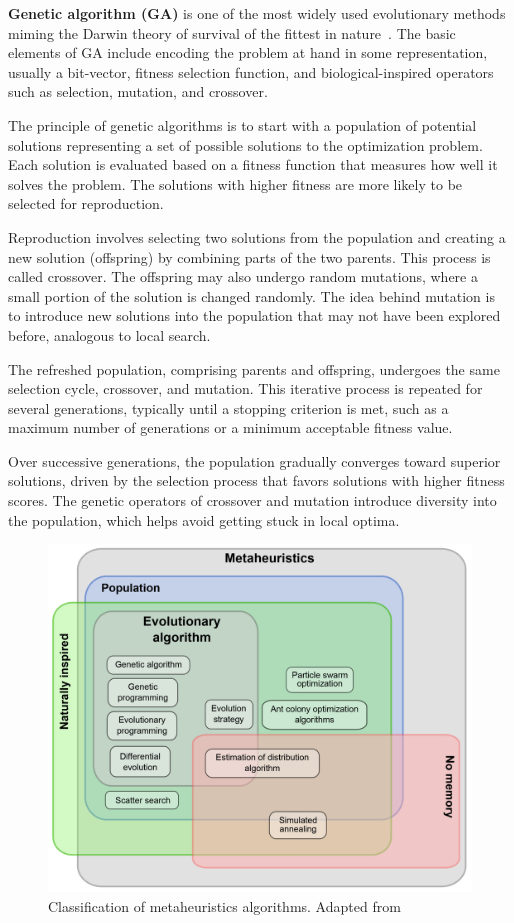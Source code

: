 \textbf{Genetic algorithm (GA)} is one of the most widely used evolutionary methods miming the Darwin theory of survival of the fittest in nature~\cite{darwin1859}. The basic elements of GA include encoding the problem at hand in some representation, usually a bit-vector, fitness selection function, and biological-inspired operators such as selection, mutation, and crossover.

The principle of genetic algorithms is to start with a population of potential solutions representing a set of possible solutions to the optimization problem. Each solution is evaluated based on a fitness function that measures how well it solves the problem. The solutions with higher fitness are more likely to be selected for reproduction.

Reproduction involves selecting two solutions from the population and creating a new solution (offspring) by combining parts of the two parents. This process is called crossover. The offspring may also undergo random mutations, where a small portion of the solution is changed randomly. The idea behind mutation is to introduce new solutions into the population that may not have been explored before, analogous to local search.

The refreshed population, comprising parents and offspring, undergoes the same selection cycle, crossover, and mutation. This iterative process is repeated for several generations, typically until a stopping criterion is met, such as a maximum number of generations or a minimum acceptable fitness value.

Over successive generations, the population gradually converges toward superior solutions, driven by the selection process that favors solutions with higher fitness scores. The genetic operators of crossover and mutation introduce diversity into the population, which helps avoid getting stuck in local optima.

\begin{figure}[H]
    \centering
    \includegraphics[width=\textwidth]{figures/Metaheuristics.png}
    \caption{Classification of metaheuristics algorithms. Adapted from ~\cite{metaheuristics}
    }
    \label{fig:metaheuristics}
\end{figure}

